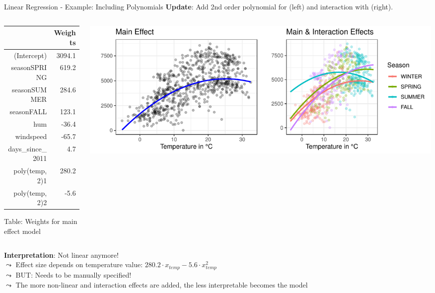 \documentclass[11pt,compress,t,notes=noshow, aspectratio=169, xcolor=table]{beamer}
\begin{document}
\begin{frame}{Linear Regression - Example: Including Polynomials}
\textbf{Update}: Add 2nd order polynomial for  (left) and interaction with  (right).
\begin{columns}[T]
\begin{column}{0.25\textwidth}
\begin{tiny}
\begin{table}[ht]
\centering
\begin{tabular}{rr}
  \hline
 & Weights \\ 
  \hline
(Intercept) & 3094.1 \\ 
  seasonSPRING & 619.2 \\ 
  seasonSUMMER & 284.6 \\ 
  seasonFALL & 123.1 \\ 
  hum & -36.4 \\ 
  windspeed & -65.7 \\ 
  days\_since\_2011 & 4.7 \\ 
  poly(temp, 2)1 & 280.2 \\ 
  poly(temp, 2)2 & -5.6 \\ 
   \hline
\end{tabular}
\end{table}
   Table: Weights for main effect model

\end{tiny}

\end{column}
\begin{column}{0.7\textwidth}
\includegraphics[width = \textwidth]{figure/poly_main_vs_interaction_effects.pdf}
\end{column}
\end{columns}
\vfill
\pause
\textbf{Interpretation}: Not linear anymore!\\ 
$\leadsto$ Effect size depends on temperature value: $280.2 \cdot x_{temp} - 5.6 \cdot x_{temp}^2$\\
$\leadsto$ BUT: Needs to be manually specified!\\
$\leadsto$ The more non-linear and interaction effects are added, the less interpretable becomes the model
\end{frame}
\end{document}
